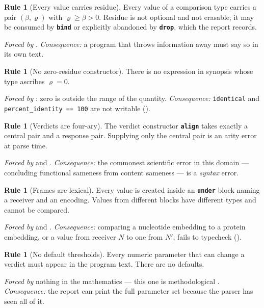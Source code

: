 \documentclass[11pt,twocolumn,a4paper]{article}
\theoremstyle{plain}
\theoremstyle{definition}
\newtheorem{drule}[theorem]{Rule}
\theoremstyle{remark}
\newcommand{\flo}{\beta}                       %
\newcommand{\Res}{\varrho}                     %
\newcommand{\kw}[1]{\texttt{\textbf{#1}}}
\begin{document}
\begin{drule}[Every value carries residue]
\label{rule:residue}
Every value of a comparison type carries a pair $(\flo,\Res)$ with
$\Res\ge\flo>0$. Residue is not optional and not erasable; it may be
consumed by \kw{bind} or explicitly abandoned by \kw{drop}, which the
report records.
\end{drule}
\noindent\emph{Forced by} . \emph{Consequence:} a program
that throws information away must say so in its own text.

\begin{drule}[No zero-residue constructor]
\label{rule:nozero}
There is no expression in synopsis whose type ascribes $\Res=0$.
\end{drule}
\noindent\emph{Forced by} : zero is outside the range of
the quantity. \emph{Consequence:} \texttt{identical} and
\texttt{percent\_identity == 100} are not writable
().

\begin{drule}[Verdicts are four-ary]
\label{rule:arity}
The verdict constructor \kw{align} takes exactly a central pair and a
response pair. Supplying only the central pair is an arity error at
parse time.
\end{drule}
\noindent\emph{Forced by}  and .
\emph{Consequence:} the commonest scientific error in this domain
--- concluding functional sameness from content sameness --- is a
\emph{syntax} error.

\begin{drule}[Frames are lexical]
\label{rule:frames}
Every value is created inside an \kw{under} block naming a receiver and
an encoding. Values from different blocks have different types and
cannot be compared.
\end{drule}
\noindent\emph{Forced by}  and .
\emph{Consequence:} comparing a nucleotide embedding to a protein
embedding, or a value from receiver $N$ to one from $N'$, fails to
typecheck ().

\begin{drule}[No default thresholds]
\label{rule:nodefault}
Every numeric parameter that can change a verdict must appear in the
program text. There are no defaults.
\end{drule}
\noindent\emph{Forced by} nothing in the mathematics --- this one is
methodological \cite{simmons2011false,gelman2013garden}.
\emph{Consequence:} the report can print the full parameter set because
the parser has seen all of it.
\end{document}
